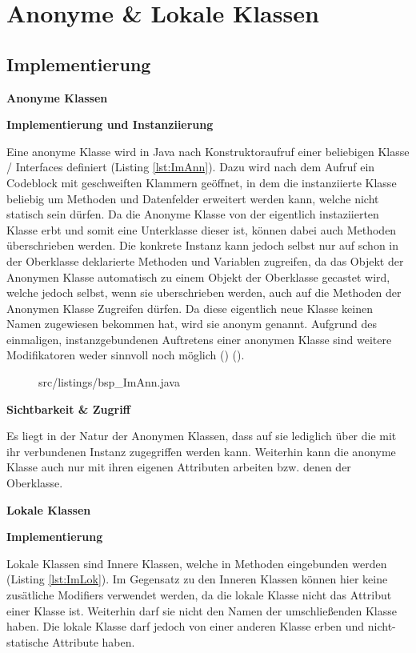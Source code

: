 \section{Anonyme \& Lokale Klassen}
\subsection {Implementierung}

{\Large \bf Anonyme Klassen}

{\bf Implementierung und Instanziierung}

Eine anonyme Klasse wird in Java nach Konstruktoraufruf einer beliebigen Klasse / Interfaces definiert (Listing \ref{lst:ImAnn}).
Dazu wird nach dem Aufruf ein Codeblock mit geschweiften Klammern geöffnet, in dem die instanziierte Klasse beliebig um Methoden und Datenfelder erweitert werden kann, welche nicht statisch sein dürfen.
Da die Anonyme Klasse von der eigentlich instaziierten Klasse erbt und somit eine Unterklasse dieser ist, können dabei auch Methoden überschrieben werden.
Die konkrete Instanz kann jedoch selbst nur auf schon in der Oberklasse deklarierte Methoden und Variablen zugreifen, da das Objekt der Anonymen Klasse automatisch zu einem Objekt der Oberklasse gecastet wird, welche jedoch selbst, wenn sie uberschrieben werden, auch auf die Methoden der Anonymen Klasse Zugreifen dürfen.
Da diese eigentlich neue Klasse keinen Namen zugewiesen bekommen hat, wird sie anonym genannt.
Aufgrund des einmaligen, instanzgebundenen Auftretens einer anonymen Klasse sind weitere Modifikatoren weder sinnvoll noch möglich (\cite{goll2013java}) (\cite{Oracle:JLS9}).

\begin{figure}[h]
\lstset{language=Java}
 {src/listings/bsp_ImAnn.java}
\end{figure}

{\bf Sichtbarkeit \& Zugriff}

Es liegt in der Natur der Anonymen Klassen, dass auf sie lediglich über die mit ihr verbundenen Instanz zugegriffen werden kann.
Weiterhin kann die anonyme Klasse auch nur mit ihren eigenen Attributen arbeiten bzw. denen der Oberklasse.

\newpage

{\Large \bf Lokale Klassen}

{\bf Implementierung}

Lokale Klassen sind Innere Klassen, welche in Methoden eingebunden werden (Listing \ref{lst:ImLok}).
Im Gegensatz zu den Inneren Klassen können hier keine zusätliche Modifiers verwendet werden, da die lokale Klasse nicht das Attribut einer Klasse ist.
Weiterhin darf sie nicht den Namen der umschließenden Klasse haben.
Die lokale Klasse darf jedoch von einer anderen Klasse erben und nicht-statische Attribute haben.


